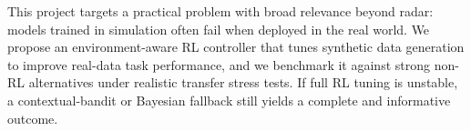 This project targets a practical problem with broad relevance beyond radar: models trained in simulation often fail when deployed in the real world. We propose an environment-aware RL controller that tunes synthetic data generation to improve real-data task performance, and we benchmark it against strong non-RL alternatives under realistic transfer stress tests. If full RL tuning is unstable, a contextual-bandit or Bayesian fallback still yields a complete and informative outcome.
